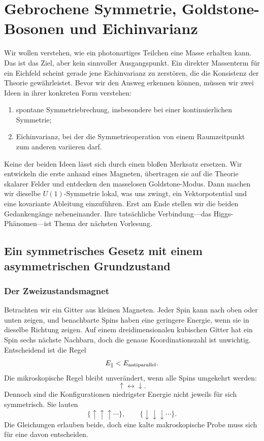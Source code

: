\chapter{Gebrochene Symmetrie, Goldstone-Bosonen und Eichinvarianz}

Wir wollen verstehen, wie ein photonartiges Teilchen eine Masse erhalten kann. Das ist das Ziel, aber kein sinnvoller Ausgangspunkt. Ein direkter Massenterm für ein Eichfeld scheint gerade jene Eichinvarianz zu zerstören, die die Konsistenz der Theorie gewährleistet. Bevor wir den Ausweg erkennen können, müssen wir zwei Ideen in ihrer konkreten Form verstehen:
\begin{enumerate}
  \item spontane Symmetriebrechung, insbesondere bei einer kontinuierlichen Symmetrie;
  \item Eichinvarianz, bei der die Symmetrieoperation von einem Raumzeitpunkt zum anderen variieren darf.
\end{enumerate}
Keine der beiden Ideen lässt sich durch einen bloßen Merksatz ersetzen. Wir entwickeln die erste anhand eines Magneten, übertragen sie auf die Theorie skalarer Felder und entdecken den masselosen Goldstone-Modus. Dann machen wir dieselbe \(U(1)\)-Symmetrie lokal, was uns zwingt, ein Vektorpotential und eine kovariante Ableitung einzuführen. Erst am Ende stellen wir die beiden Gedankengänge nebeneinander. Ihre tatsächliche Verbindung---das Higgs-Phänomen---ist Thema der nächsten Vorlesung.

\section{Ein symmetrisches Gesetz mit einem asymmetrischen Grundzustand}

\subsection{Der Zweizustandsmagnet}

Betrachten wir ein Gitter aus kleinen Magneten. Jeder Spin kann nach oben oder unten zeigen, und benachbarte Spins haben eine geringere Energie, wenn sie in dieselbe Richtung zeigen. Auf einem dreidimensionalen kubischen Gitter hat ein Spin sechs nächste Nachbarn, doch die genaue Koordinationszahl ist unwichtig. Entscheidend ist die Regel
\begin{equation}
  E_{\parallel}<E_{\rm antiparallel}.
\end{equation}
Die mikroskopische Regel bleibt unverändert, wenn alle Spins umgekehrt werden:
\begin{equation}
  \uparrow\longleftrightarrow\downarrow.
\end{equation}
Dennoch sind die Konfigurationen niedrigster Energie nicht jeweils für sich symmetrisch. Sie lauten
\begin{equation}
  \{\uparrow\uparrow\uparrow\cdots\},
  \qquad
  \{\downarrow\downarrow\downarrow\cdots\}.
\end{equation}
Die Gleichungen erlauben beide, doch eine kalte makroskopische Probe muss sich für eine davon entscheiden.

